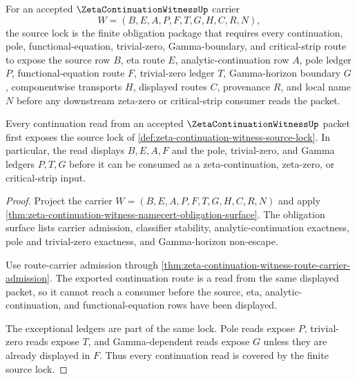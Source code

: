 \begin{definition}
\label{def:zeta-continuation-witness-source-lock}
For an accepted $\ZetaContinuationWitnessUp$ carrier
$$
W=(B,E,A,P,F,T,G,H,C,R,N),
$$
the source lock is the finite obligation package that requires every continuation, pole, functional-equation, trivial-zero, Gamma-boundary, and critical-strip route to expose the source row $B$, eta route $E$, analytic-continuation row $A$, pole ledger $P$, functional-equation route $F$, trivial-zero ledger $T$, Gamma-horizon boundary $G$, componentwise transports $H$, displayed routes $C$, provenance $R$, and local name $N$ before any downstream zeta-zero or critical-strip consumer reads the packet.
\end{definition}

\begin{theorem}
\label{thm:zeta-continuation-witness-source-lock-coverage}
Every continuation read from an accepted $\ZetaContinuationWitnessUp$ packet first exposes the source lock of \autoref{def:zeta-continuation-witness-source-lock}. In particular, the read displays $B,E,A,F$ and the pole, trivial-zero, and Gamma ledgers $P,T,G$ before it can be consumed as a zeta-continuation, zeta-zero, or critical-strip input.
\end{theorem}
\begin{proof}
Project the carrier $W=(B,E,A,P,F,T,G,H,C,R,N)$ and apply \autoref{thm:zeta-continuation-witness-namecert-obligation-surface}. The obligation surface lists carrier admission, classifier stability, analytic-continuation exactness, pole and trivial-zero exactness, and Gamma-horizon non-escape.

Use route-carrier admission through \autoref{thm:zeta-continuation-witness-route-carrier-admission}. The exported continuation route is a read from the same displayed packet, so it cannot reach a consumer before the source, eta, analytic-continuation, and functional-equation rows have been displayed.

The exceptional ledgers are part of the same lock. Pole reads expose $P$, trivial-zero reads expose $T$, and Gamma-dependent reads expose $G$ unless they are already displayed in $F$. Thus every continuation read is covered by the finite source lock.
\end{proof}

